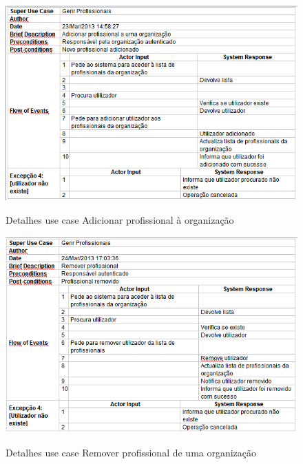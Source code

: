 \documentclass[12pt,a4paper]{article}
\begin{document}
\begin{figure}[h!]
\centering
\includegraphics[scale=0.7]{d_usecase/adicionarprofissional}
\label{usecase}
\caption{Detalhes use case Adicionar profissional à organização}
\end{figure}



\begin{figure}[h!]
\centering
\includegraphics[scale=0.7]{d_usecase/removerprofissional}
\label{usecase}
\caption{Detalhes use case Remover profissional de uma organização}
\end{figure}
\end{document}
